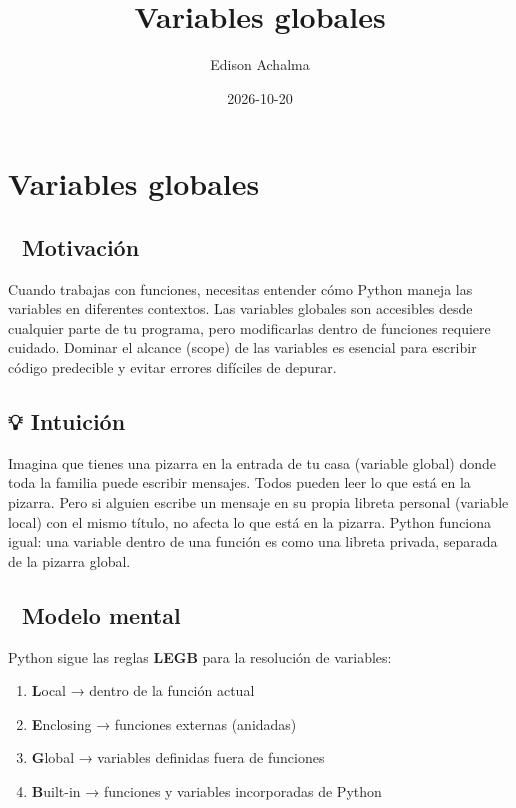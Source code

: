 \documentclass[
  doc,
  floatsintext,
  longtable,
  a4paper,
  nolmodern,
  notxfonts,
  notimes,
  12pt,
  colorlinks=true,linkcolor=blue,citecolor=blue,urlcolor=blue]{apa7}
\title{Variables globales}
\author{Edison Achalma}
\affiliation{
{Escuela Profesional de Economía, Universidad Nacional de San Cristóbal
de Huamanga}}
\date{2026-10-20}
\providecommand{\tightlist}{%
  \setlength{\itemsep}{0pt}\setlength{\parskip}{0pt}}
\begin{document}
\maketitle


\hypertarget{toc}{}
\tableofcontents
\newpage
\section[Introduction]{Variables globales}

\setcounter{secnumdepth}{3}

\setlength\LTleft{0pt}




\subsection{🎯 Motivación}\label{motivaciuxf3n}

Cuando trabajas con funciones, necesitas entender cómo Python maneja las
variables en diferentes contextos. Las variables globales son accesibles
desde cualquier parte de tu programa, pero modificarlas dentro de
funciones requiere cuidado. Dominar el alcance (scope) de las variables
es esencial para escribir código predecible y evitar errores difíciles
de depurar.

\subsection{💡 Intuición}\label{intuiciuxf3n}

Imagina que tienes una pizarra en la entrada de tu casa (variable
global) donde toda la familia puede escribir mensajes. Todos pueden leer
lo que está en la pizarra. Pero si alguien escribe un mensaje en su
propia libreta personal (variable local) con el mismo título, no afecta
lo que está en la pizarra. Python funciona igual: una variable dentro de
una función es como una libreta privada, separada de la pizarra global.

\subsection{🧠 Modelo mental}\label{modelo-mental}

Python sigue las reglas \textbf{LEGB} para la resolución de variables:

\begin{enumerate}
\def\labelenumi{\arabic{enumi}.}
\tightlist
\item
  \textbf{L}ocal → dentro de la función actual
\item
  \textbf{E}nclosing → funciones externas (anidadas)
\item
  \textbf{G}lobal → variables definidas fuera de funciones
\item
  \textbf{B}uilt-in → funciones y variables incorporadas de Python
\end{enumerate}
\end{document}
